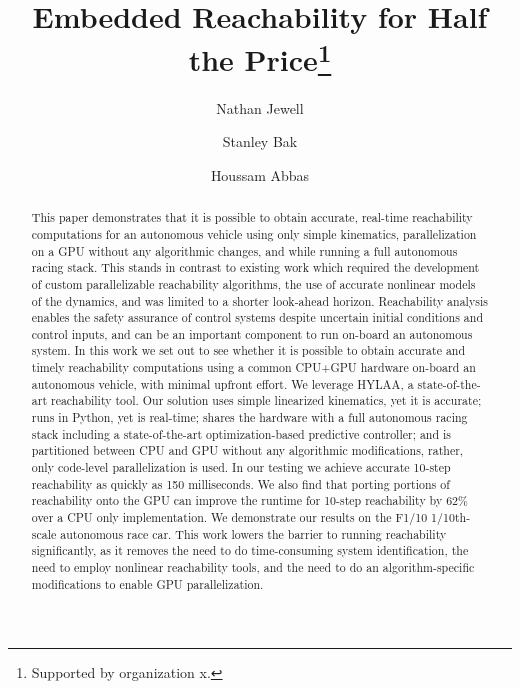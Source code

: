 \documentclass[runningheads]{llncs}
\begin{document}
%
\title{Embedded Reachability for Half the Price\thanks{Supported by organization x.}}
%
%
\author{Nathan Jewell \and
Stanley Bak \and
Houssam Abbas} 
%
%
%
\maketitle              %
%
\begin{abstract}
This paper demonstrates that it is possible to obtain accurate, real-time reachability computations for an autonomous vehicle using only simple kinematics, parallelization on a GPU without any algorithmic changes, and while running a full autonomous racing stack.
This stands in contrast to existing work which required the development of custom parallelizable reachability algorithms, the use of accurate nonlinear models of the dynamics, and was limited to a shorter look-ahead horizon. 
Reachability analysis enables the safety assurance of control systems despite uncertain initial conditions and control inputs, and can be an important component to run on-board an autonomous system.
%
In this work we set out to see whether it is possible to obtain accurate and timely reachability computations using a common CPU+GPU hardware on-board an autonomous vehicle, with minimal upfront effort.
We leverage HYLAA, a state-of-the-art reachability tool.
Our solution uses simple linearized kinematics, yet it is accurate; runs in Python, yet is real-time; shares the hardware with a full autonomous racing stack including a state-of-the-art optimization-based predictive controller; and is partitioned between CPU and GPU without any algorithmic modifications, rather, only code-level parallelization is used.
In our testing we achieve accurate 10-step reachability as quickly as 150 milliseconds. We also find that porting portions of reachability onto the GPU can improve the runtime for 10-step reachability by 62\% over a CPU only implementation.%
We demonstrate our results on the F1/10 1/10th-scale autonomous race car.
This work lowers the barrier to running reachability significantly, as it removes the need to do time-consuming system identification, the need to employ nonlinear reachability tools, and the need to do an algorithm-specific modifications to enable GPU parallelization.

\end{abstract}
%
%
%
\end{document}
